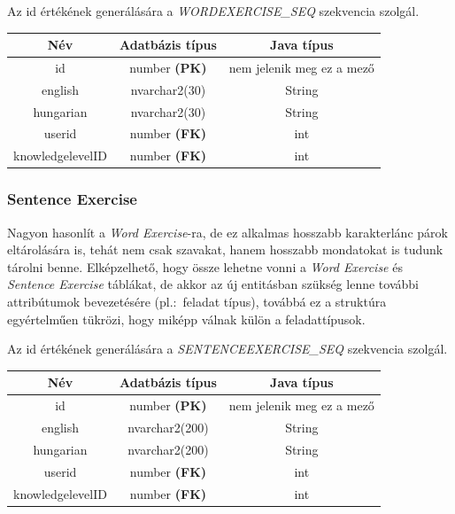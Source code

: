 \documentclass[11pt, a4paper]{article}
\begin{document}
    Az id értékének generálására a \textit{WORDEXERCISE\_SEQ} szekvencia szolgál.
    
    \begin{table}[!h]
    	\centering
    	\begin{tabular} {|c|c|c|}
    		\hline
    		Név & Adatbázis típus & Java típus \\
    		\hline
    		id & number \textbf{(PK)} & nem jelenik meg ez a mező \\
    		english & nvarchar2(30) & String \\
    		hungarian & nvarchar2(30) & String \\
    		userid & number \textbf{(FK)} & int \\
    		knowledgelevelID & number \textbf{(FK)} & int \\
    		\hline
    	\end{tabular}
    \end{table}
    
    \subsubsection{Sentence Exercise}
    Nagyon hasonlít a \textit{Word Exercise}-ra, de ez alkalmas hosszabb karakterlánc párok eltárolására is, tehát nem csak szavakat, hanem hosszabb mondatokat is tudunk tárolni benne. Elképzelhető, hogy össze lehetne vonni a \textit{Word Exercise} és \textit{Sentence Exercise} táblákat, de akkor az új entitásban szükség lenne további attribútumok bevezetésére (pl.:~feladat típus), továbbá ez a struktúra egyértelműen tükrözi, hogy miképp válnak külön a feladattípusok.
    
    Az id értékének generálására a \textit{SENTENCEEXERCISE\_SEQ} szekvencia szolgál.
    
    \begin{table}[!h]
    	\centering
    	\begin{tabular} {|c|c|c|}
    		\hline
    		Név & Adatbázis típus & Java típus \\
    		\hline
    		id & number \textbf{(PK)} & nem jelenik meg ez a mező \\
    		english & nvarchar2(200) & String \\
    		hungarian & nvarchar2(200) & String \\
    		userid & number \textbf{(FK)} & int \\
    		knowledgelevelID & number \textbf{(FK)} & int \\
    		\hline
    	\end{tabular}
    \end{table}
    
\end{document}
